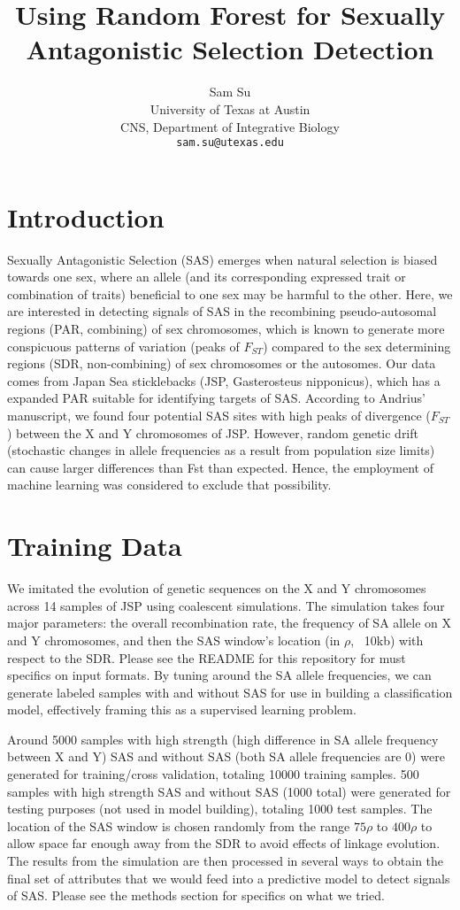 \documentclass[10pt]{article}
\title{Using Random Forest for Sexually Antagonistic Selection Detection}
\author{
  Sam Su \\
  University of Texas at Austin \\
  CNS, Department of Integrative Biology \\
  {\tt sam.su@utexas.edu} \\}
\date{}
\begin{document}
\maketitle

\section{Introduction}

Sexually Antagonistic Selection (SAS) emerges when natural selection is biased towards one sex, where an allele (and its corresponding expressed trait or combination of traits) beneficial to one sex may be harmful to the other. Here, we are interested in detecting signals of SAS in the recombining pseudo-autosomal regions (PAR, combining) of sex chromosomes, which is known to generate more conspicuous patterns of variation (peaks of $F_{ST}$) compared to the sex determining regions (SDR, non-combining) of sex chromosomes or the autosomes. Our data comes from Japan Sea sticklebacks (JSP, Gasterosteus nipponicus), which has a expanded PAR suitable for identifying targets of SAS. According to Andrius' manuscript, we found four potential SAS sites with high peaks of divergence ($F_{ST}$) between the X and Y chromosomes of JSP. However, random genetic drift (stochastic changes in allele frequencies as a result from population size limits) can cause larger differences than Fst than expected. Hence, the employment of machine learning was considered to exclude that possibility. 

\section{Training Data}

We imitated the evolution of genetic sequences on the X and Y chromosomes across 14 samples of JSP using coalescent simulations. The simulation takes four major parameters: the overall recombination rate, the frequency of SA allele on X and Y chromosomes, and then the SAS window's location (in $\rho$, ~10kb) with respect to the SDR. Please see the README for this repository for must specifics on input formats. By tuning around the SA allele frequencies, we can generate labeled samples with and without SAS for use in building a classification model, effectively framing this as a supervised learning problem. 

Around 5000 samples with high strength (high difference in SA allele frequency between X and Y) SAS and without SAS (both SA allele frequencies are 0) were generated for training/cross validation, totaling 10000 training samples. 500 samples with high strength SAS and without SAS (1000 total) were generated for testing purposes (not used in model building), totaling 1000 test samples. The location of the SAS window is chosen randomly from the range $75 \rho$ to $400 \rho$ to allow space far enough away from the SDR to avoid effects of linkage evolution. The results from the simulation are then processed in several ways to obtain the final set of attributes that we would feed into a predictive model to detect signals of SAS. Please see the methods section for specifics on what we tried. 
\end{document}
